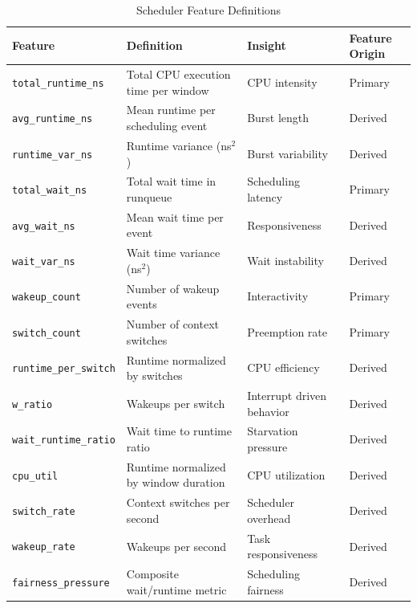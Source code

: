 \documentclass{llncs}
\begin{document}
\begin{table}[!t]

\caption{Scheduler Feature Definitions}

\label{tab:features}
\centering
\scriptsize
\renewcommand{\arraystretch}{2}
\setlength{\tabcolsep}{2pt}
\begin{tabular}{|p{2.6cm}|p{3.0cm}|p{2.2cm}|p{2.0cm}|}
\hline
\textbf{Feature} & \textbf{Definition} & \textbf{Insight} & \textbf{Feature Origin} \\
\hline
\texttt{total\_runtime\_ns} & Total CPU execution time per window & CPU intensity & Primary \\
\hline
\texttt{avg\_runtime\_ns} & Mean runtime per scheduling event & Burst length & Derived \\
\hline
\texttt{runtime\_var\_ns} & Runtime variance (ns$^{2}$) & Burst variability & Derived \\
\hline
\texttt{total\_wait\_ns} & Total wait time in runqueue & Scheduling latency & Primary \\
\hline
\texttt{avg\_wait\_ns} & Mean wait time per event & Responsiveness & Derived \\
\hline
\texttt{wait\_var\_ns} & Wait time variance (ns$^{2}$) & Wait instability & Derived \\
\hline
\texttt{wakeup\_count} & Number of wakeup events & Interactivity & Primary \\
\hline
\texttt{switch\_count} & Number of context switches & Preemption rate & Primary \\
\hline
\texttt{runtime\_per\_switch} & Runtime normalized by switches & CPU efficiency & Derived \\
\hline
\texttt{w\_ratio} & Wakeups per switch & Interrupt driven behavior & Derived \\
\hline
\texttt{wait\_runtime\_ratio} & Wait time to runtime ratio & Starvation pressure & Derived \\
\hline
\texttt{cpu\_util} & Runtime normalized by window duration & CPU utilization & Derived \\
\hline
\texttt{switch\_rate} & Context switches per second & Scheduler overhead & Derived \\
\hline
\texttt{wakeup\_rate} & Wakeups per second & Task responsiveness & Derived \\
\hline
\texttt{fairness\_pressure} & Composite wait/runtime metric & Scheduling fairness & Derived \\
\hline
\end{tabular}
\end{table}
\end{document}
